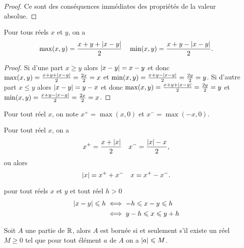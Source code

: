   \begin{proof}
    Ce sont des conséquences immédiates des propriétés de la valeur absolue.
  \end{proof}
  \begin{prop}
    Pour tous réels \(x\) et \(y\), on a
    \begin{equation}
      \max(x, y) = \frac{x + y + \left\lvert x - y\right\rvert}{2} \quad \min(x, y) = \frac{x + y 
      - \left\lvert x - y\right\rvert}{2}.
    \end{equation}
  \end{prop}
  \begin{proof}
    Si d'une part \(x\geqslant y\) alors \(\left\lvert x - y\right\rvert = x - y\) et donc 
    \(\max(x, y) = \frac{x + y + \left\lvert x - y\right\rvert}{2} = \frac{2x}{2} = x\) et 
    \(\min(x, y) = \frac{x + y - \left\lvert x - y\right\rvert}{2} = \frac{2y}{2} = y\). Si 
    d'autre part \(x\leqslant y\) alors \(\left\lvert x - y\right\rvert = y - x\) et donc 
    \(\max(x, y) = \frac{x + y + \left\lvert x - y\right\rvert}{2} = \frac{2y}{2} = y\) et 
    \(\min(x, y) = \frac{x + y - \left\lvert x - y\right\rvert}{2} = \frac{2x}{2} = x\).
  \end{proof}
  \begin{defdef}
    Pour tout réel \(x\), on note \(x^+ = \max(x, 0)\) et \(x^- = \max( - x, 
    0)\).
  \end{defdef}
  \begin{prop}
    Pour tout réel \(x\), on a
    \begin{equation}
      x^+ = \frac{x + \left\lvert x\right\rvert}{2} \quad x^- = \frac{\left\lvert x\right\rvert - x}{2},
    \end{equation}
    ou alors
    \begin{equation}
      \left\lvert x\right\rvert = x^ + +x^- \quad x = x^+ - x^ - .
    \end{equation}
  \end{prop}
  \begin{prop}
    pour tout réels \(x\) et \(y\) et tout réel \(h>0\)
    \begin{align}
      \left\lvert x - y\right\rvert\leqslant h &\iff -h \leqslant x - y \leqslant h\\
                             &\iff y - h \leqslant x \leqslant y + h
    \end{align}
  \end{prop}
  \begin{prop}
    Soit \(A\) une partie de \(\mathbb{R}\), alors \(A\) est bornée si et seulement s'il 
    existe un réel \(M\geqslant 0\) tel que pour tout élément \(a\) de \(A\) on 
    a \(\left\lvert a\right\rvert\leqslant M\).
  \end{prop}
